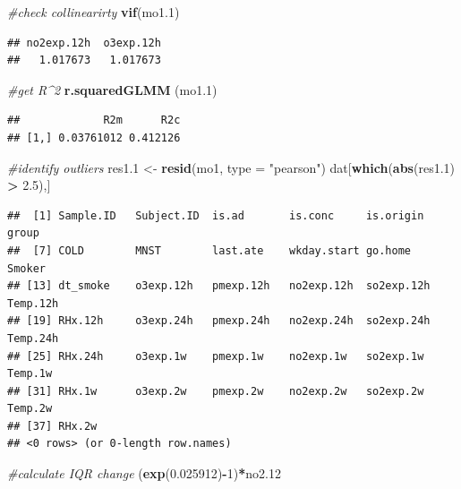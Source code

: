 \documentclass[12pt,]{article}
\newenvironment{Shaded}{\begin{snugshade}}{\end{snugshade}}
\newcommand{\CommentTok}[1]{\textcolor[rgb]{0.56,0.35,0.01}{\textit{#1}}}
\newcommand{\DataTypeTok}[1]{\textcolor[rgb]{0.13,0.29,0.53}{#1}}
\newcommand{\DecValTok}[1]{\textcolor[rgb]{0.00,0.00,0.81}{#1}}
\newcommand{\FloatTok}[1]{\textcolor[rgb]{0.00,0.00,0.81}{#1}}
\newcommand{\KeywordTok}[1]{\textcolor[rgb]{0.13,0.29,0.53}{\textbf{#1}}}
\newcommand{\NormalTok}[1]{#1}
\newcommand{\OperatorTok}[1]{\textcolor[rgb]{0.81,0.36,0.00}{\textbf{#1}}}
\newcommand{\StringTok}[1]{\textcolor[rgb]{0.31,0.60,0.02}{#1}}
\begin{document}
\begin{Shaded}
\begin{Highlighting}[]
\CommentTok{#check collinearirty}
\KeywordTok{vif}\NormalTok{(mo1}\FloatTok{.1}\NormalTok{)}
\end{Highlighting}
\end{Shaded}

\begin{verbatim}
## no2exp.12h  o3exp.12h 
##   1.017673   1.017673
\end{verbatim}

\begin{Shaded}
\begin{Highlighting}[]
\CommentTok{#get R^2}
\KeywordTok{r.squaredGLMM}\NormalTok{ (mo1}\FloatTok{.1}\NormalTok{)}
\end{Highlighting}
\end{Shaded}

\begin{verbatim}
##             R2m      R2c
## [1,] 0.03761012 0.412126
\end{verbatim}

\begin{Shaded}
\begin{Highlighting}[]
\CommentTok{#identify outliers}
\NormalTok{res1}\FloatTok{.1}\NormalTok{ <-}\StringTok{ }\KeywordTok{resid}\NormalTok{(mo1, }\DataTypeTok{type =} \StringTok{"pearson"}\NormalTok{)}
\NormalTok{dat[}\KeywordTok{which}\NormalTok{(}\KeywordTok{abs}\NormalTok{(res1}\FloatTok{.1}\NormalTok{) }\OperatorTok{>}\StringTok{ }\FloatTok{2.5}\NormalTok{),]}
\end{Highlighting}
\end{Shaded}

\begin{verbatim}
##  [1] Sample.ID   Subject.ID  is.ad       is.conc     is.origin   group      
##  [7] COLD        MNST        last.ate    wkday.start go.home     Smoker     
## [13] dt_smoke    o3exp.12h   pmexp.12h   no2exp.12h  so2exp.12h  Temp.12h   
## [19] RHx.12h     o3exp.24h   pmexp.24h   no2exp.24h  so2exp.24h  Temp.24h   
## [25] RHx.24h     o3exp.1w    pmexp.1w    no2exp.1w   so2exp.1w   Temp.1w    
## [31] RHx.1w      o3exp.2w    pmexp.2w    no2exp.2w   so2exp.2w   Temp.2w    
## [37] RHx.2w     
## <0 rows> (or 0-length row.names)
\end{verbatim}

\begin{Shaded}
\begin{Highlighting}[]
\CommentTok{#calculate IQR change}
\NormalTok{(}\KeywordTok{exp}\NormalTok{(}\FloatTok{0.025912}\NormalTok{)}\OperatorTok{-}\DecValTok{1}\NormalTok{)}\OperatorTok{*}\NormalTok{no2}\FloatTok{.12}
\end{Highlighting}
\end{Shaded}
\end{document}
